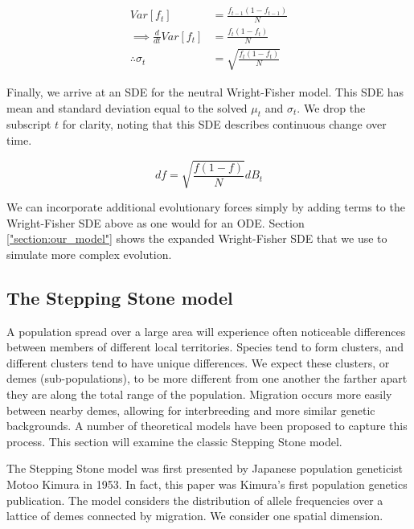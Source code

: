 
\begin{equation}
    \begin{split}
         Var[f_t] &= \frac{f_{t-1}(1-f_{t-1})}{N} \\
         \implies \frac{d}{dt} Var[f_t] &= \frac{f_t(1-f_t)}{N} \\
         \therefore \sigma_t &= \sqrt{\frac{f_t(1-f_t)}{N}}
    \end{split}
\end{equation}

Finally, we arrive at an SDE for the neutral Wright-Fisher model. This SDE has mean and standard deviation equal to the solved $\mu_t$ and $\sigma_t$. We drop the subscript $t$ for clarity, noting that this SDE describes continuous change over time. 

\begin{equation}
    df = \sqrt{\frac{f(1-f)}{N}} dB_t
\end{equation}


We can incorporate additional evolutionary forces simply by adding terms to the Wright-Fisher SDE above as one would for an ODE. Section \ref{"section:our_model"} shows the expanded Wright-Fisher SDE that we use to simulate more complex evolution. 


\subsection{The Stepping Stone model}

A population spread over a large area will experience often noticeable differences between members of different local territories. Species tend to form clusters, and different clusters tend to have unique differences. We expect these clusters, or demes (sub-populations), to be more different from one another the farther apart they are along the total range of the population. Migration occurs more easily between nearby demes, allowing for interbreeding and more similar genetic  backgrounds. A number of theoretical models have been proposed to capture this process.\cite{wright_1943} \cite{malecot_1959} This section will examine the classic Stepping Stone model. 

The Stepping Stone model was first presented by Japanese population geneticist Motoo Kimura in 1953. \cite{kimura_1953} In fact, this paper was Kimura's first population genetics publication. \cite{crow_1994} The model considers the distribution of allele frequencies over a lattice of demes connected by migration. We consider one spatial dimension. 

